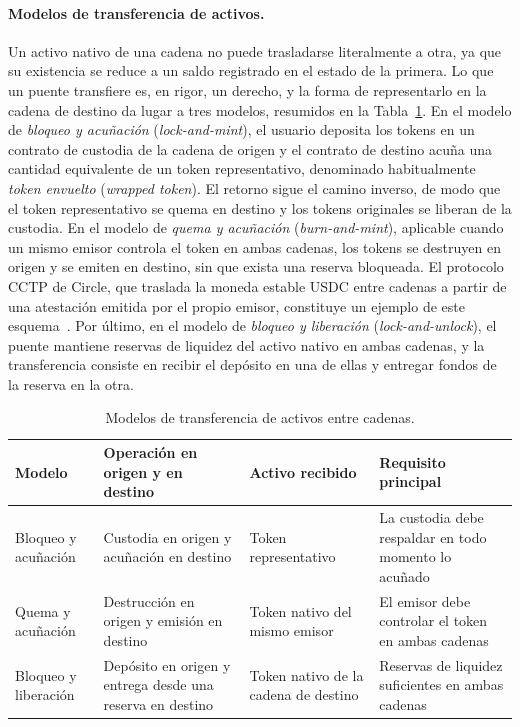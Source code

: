 \paragraph{Modelos de transferencia de activos.} Un activo nativo de una cadena no puede
trasladarse literalmente a otra, ya que su existencia se reduce a un saldo registrado en el estado
de la primera. Lo que un puente transfiere es, en rigor, un derecho, y la forma de representarlo
en la cadena de destino da lugar a tres modelos, resumidos en la
Tabla~\ref{tab:puentes_transferencia}. En el modelo de \textit{bloqueo y acuñación}
(\textit{lock-and-mint}), el usuario deposita los tokens en un contrato de custodia de la cadena
de origen y el contrato de destino acuña una cantidad equivalente de un token representativo,
denominado habitualmente \textit{token envuelto} (\textit{wrapped token}). El retorno sigue el
camino inverso, de modo que el token representativo se quema en destino y los tokens originales
se liberan de la custodia. En el modelo de \textit{quema y acuñación} (\textit{burn-and-mint}),
aplicable cuando un mismo emisor controla el token en ambas cadenas, los tokens se destruyen en
origen y se emiten en destino, sin que exista una reserva bloqueada. El protocolo CCTP de Circle,
que traslada la moneda estable USDC entre cadenas a partir de una atestación emitida por el propio
emisor, constituye un ejemplo de este esquema~\cite{circlecctp}. Por último, en el modelo de
\textit{bloqueo y liberación} (\textit{lock-and-unlock}), el puente mantiene reservas de liquidez
del activo nativo en ambas cadenas, y la transferencia consiste en recibir el depósito en una de
ellas y entregar fondos de la reserva en la otra.

\begin{table}[htbp]
	\centering
	\caption{Modelos de transferencia de activos entre cadenas.}
	\label{tab:puentes_transferencia}
	\small
	\begin{tabular}{>{\raggedright\arraybackslash}p{2.7cm} >{\raggedright\arraybackslash}p{4.2cm} >{\raggedright\arraybackslash}p{3.3cm} >{\raggedright\arraybackslash}p{3.6cm}}
		\toprule
		\textbf{Modelo} & \textbf{Operación en origen y en destino} & \textbf{Activo recibido} &
		\textbf{Requisito principal} \\
		\midrule
		Bloqueo y acuñación & Custodia en origen y acuñación en destino & Token representativo &
		La custodia debe respaldar en todo momento lo acuñado \\
		\addlinespace
		Quema y acuñación & Destrucción en origen y emisión en destino & Token nativo del mismo
		emisor & El emisor debe controlar el token en ambas cadenas \\
		\addlinespace
		Bloqueo y liberación & Depósito en origen y entrega desde una reserva en destino & Token
		nativo de la cadena de destino & Reservas de liquidez suficientes en ambas cadenas \\
		\bottomrule
	\end{tabular}
\end{table}


